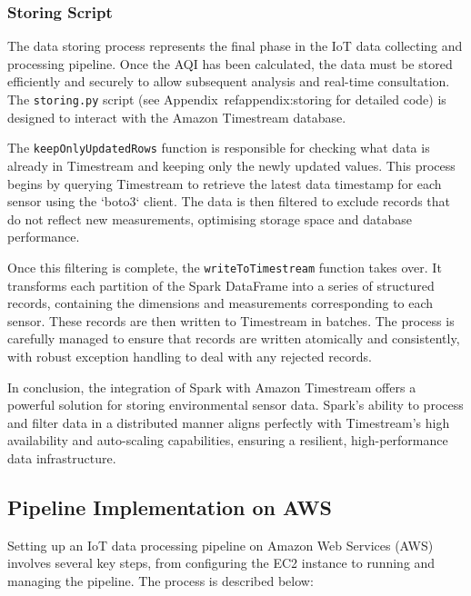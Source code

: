 \documentclass[12pt,oneside]{book} %
\begin{document}
\subsubsection{Storing Script}
The data storing process represents the final phase in the IoT data collecting
and processing pipeline. Once the AQI has been calculated, the data must be
stored efficiently and securely to allow subsequent analysis and real-time
consultation. The \texttt{storing.py} script (see
Appendix~ref{appendix:storing} for detailed code) is designed to interact with
the Amazon Timestream database.

The \texttt{keepOnlyUpdatedRows} function is responsible for checking what data
is already in Timestream and keeping only the newly updated values. This
process begins by querying Timestream to retrieve the latest data timestamp for
each sensor using the `boto3` client. The data is then filtered to exclude
records that do not reflect new measurements, optimising storage space and
database performance.

Once this filtering is complete, the \texttt{writeToTimestream} function takes
over. It transforms each partition of the Spark DataFrame into a series of
structured records, containing the dimensions and measurements corresponding to
each sensor. These records are then written to Timestream in batches. The
process is carefully managed to ensure that records are written atomically and
consistently, with robust exception handling to deal with any rejected records.

In conclusion, the integration of Spark with Amazon Timestream offers a
powerful solution for storing environmental sensor data. Spark's ability to
process and filter data in a distributed manner aligns perfectly with
Timestream's high availability and auto-scaling capabilities, ensuring a
resilient, high-performance data infrastructure.

\subsection{Pipeline Implementation on AWS}
Setting up an IoT data processing pipeline on Amazon Web Services (AWS)
involves several key steps, from configuring the EC2 instance to running and
managing the pipeline. The process is described below:
\end{document}
